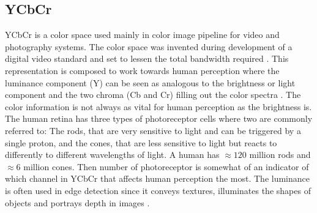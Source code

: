 \subsection{YCbCr}
\label{sec:ycbcr}
YCbCr is a color space used mainly in color image pipeline  for video and photography systems. The color space was invented during development of a digital video standard and set to lessen the total bandwidth required . This representation is composed to work towards human perception where the luminance component (Y) can be seen as analogous to the brightness or light component and the two chroma (Cb and Cr) filling out the color spectra \cite{midha2014analysis}. 
The color information is not always as vital for human perception as the brightness is. The human retina has three types of photoreceptor cells where two are commonly referred to: The rods, that are very sensitive to light and can be triggered by a single proton, and the cones, that are less sensitive to light but reacts to differently to different wavelengths of light. A human has $\approx120$ million rods and $\approx6$ million cones. Then number of photoreceptor is somewhat of an indicator of which channel in YCbCr that affects human perception the most. 
The luminance is often used in edge detection since it conveys textures, illuminates the shapes of objects and portrays depth in images \cite{su2011coldimage}\cite{prajapatiedge}. 


